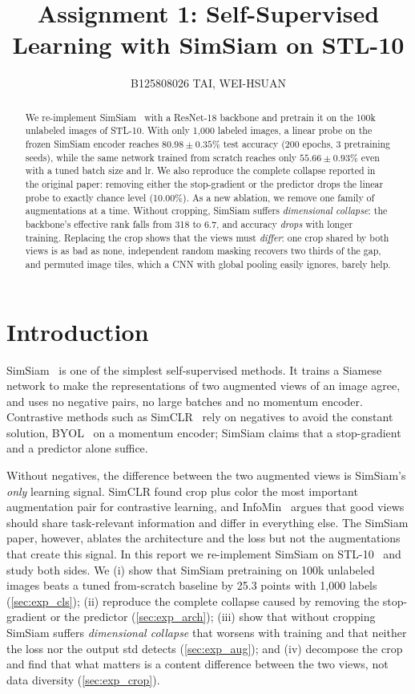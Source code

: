 \documentclass[10pt,twocolumn,letterpaper]{article}
\title{Assignment 1: Self-Supervised Learning with SimSiam on STL-10}
\author{B125808026 TAI, WEI-HSUAN}
\begin{document}
\maketitle

\begin{abstract}
We re-implement SimSiam~\cite{chen2021simsiam} with a ResNet-18 backbone and pretrain it on the 100k unlabeled images of STL-10.
With only 1,000 labeled images, a linear probe on the frozen SimSiam encoder reaches $80.98\pm0.35\%$ test accuracy (200 epochs, 3 pretraining seeds), while the same network trained from scratch reaches only $55.66\pm0.93\%$ even with a tuned batch size and lr.
We also reproduce the complete collapse reported in the original paper: removing either the stop-gradient or the predictor drops the linear probe to exactly chance level (10.00\%).
As a new ablation, we remove one family of augmentations at a time. Without cropping, SimSiam suffers \emph{dimensional collapse}: the backbone's effective rank falls from 318 to 6.7, and accuracy \emph{drops} with longer training.
Replacing the crop shows that the views must \emph{differ}: one crop shared by both views is as bad as none, independent random masking recovers two thirds of the gap, and permuted image tiles, which a CNN with global pooling easily ignores, barely help.
\end{abstract}

\section{Introduction}
\label{sec:intro}

SimSiam~\cite{chen2021simsiam} is one of the simplest self-supervised methods. It trains a Siamese network to make the representations of two augmented views of an image agree, and uses no negative pairs, no large batches and no momentum encoder.
Contrastive methods such as SimCLR~\cite{chen2020simclr} rely on negatives to avoid the constant solution, BYOL~\cite{grill2020byol} on a momentum encoder; SimSiam claims that a stop-gradient and a predictor alone suffice.

Without negatives, the difference between the two augmented views is SimSiam's \emph{only} learning signal.
SimCLR found crop plus color the most important augmentation pair for contrastive learning, and InfoMin~\cite{tian2020infomin} argues that good views should share task-relevant information and differ in everything else.
The SimSiam paper, however, ablates the architecture and the loss but not the augmentations that create this signal.
In this report we re-implement SimSiam on STL-10~\cite{coates2011stl10} and study both sides.
We (i) show that SimSiam pretraining on 100k unlabeled images beats a tuned from-scratch baseline by 25.3 points with 1,000 labels (\cref{sec:exp_cls});
(ii) reproduce the complete collapse caused by removing the stop-gradient or the predictor (\cref{sec:exp_arch});
(iii) show that without cropping SimSiam suffers \emph{dimensional collapse} that worsens with training and that neither the loss nor the output std detects (\cref{sec:exp_aug}); and
(iv) decompose the crop and find that what matters is a content difference between the two views, not data diversity (\cref{sec:exp_crop}).
\end{document}

